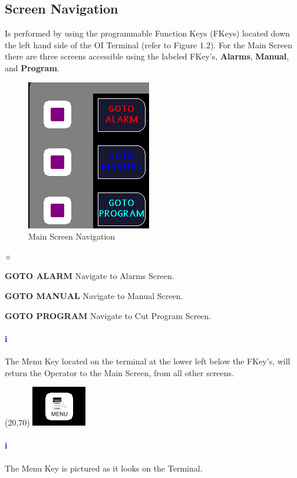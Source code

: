 \subsection{Screen Navigation}Is performed by using the programmable Function Keys (FKeys) located down the left hand side of the OI Terminal (refer to Figure 1.2). For the Main Screen there are three screens accessible using the labeled FKey's, \textbf{Alarms}, \textbf{Manual}, and \textbf{Program}.
\begin{figure}
		\centering
		\includegraphics[width=.3\linewidth]{screen-captures/main-nav}
		\caption{Main Screen Navigation}
		\label{fig:main-nav}
\end{figure}
\begin{list}{$\diamond$}{}
	\item \textbf{GOTO ALARM} Navigate to Alarms Screen.
	\item \textbf{GOTO MANUAL} Navigate to Manual Screen.
	\item \textbf{GOTO PROGRAM} Navigate to Cut Program Screen.
\end{list}

\paragraph*{\textbf{\LARGE \textcolor{blue}{i}}}
The Menu Key located on the terminal at the lower left below the FKey's, will return the Operator to the Main Screen, from all other screens.\\
\begin{minipage}{4cm}
	\begin{picture}(20,70)
	\includegraphics[width=.5\linewidth]{screen-captures/menu}
	\end{picture}
\end{minipage}\begin{minipage}[]{11cm}
\paragraph{\textbf{\LARGE \textcolor{blue}{i}}} The Menu Key is pictured as it looks on the Terminal.
\end{minipage}
\pagebreak
